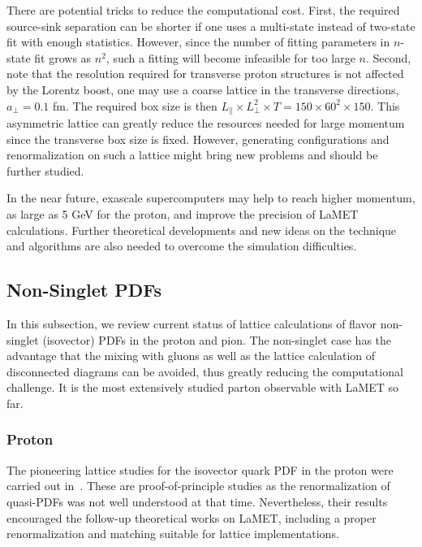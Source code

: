 There are potential tricks to reduce the computational cost.
%
First, the required source-sink separation can be shorter if one uses a multi-state instead of two-state fit with enough statistics.
%
However, since the number of fitting parameters in $n$-state fit grows as $n^2$, such a fitting will become infeasible for too large $n$.
%
Second, note that the resolution required for transverse proton structures is not affected by the Lorentz boost, one may use a coarse lattice in the transverse directions, $a_\perp=0.1$ fm.
%
The required box size is then $L_\parallel\times L_\perp^2\times T=150\times 60^2\times 150$.
%
This asymmetric lattice can greatly reduce the resources needed for large momentum since the transverse box size is fixed.
%
However, generating configurations and renormalization on such a lattice might bring new problems and should be further studied.

In the near future, exascale supercomputers may help to reach higher momentum, as large as 5 GeV for the proton,
and improve the precision of LaMET calculations. Further theoretical developments and new ideas on the technique and algorithms are also needed to overcome the simulation difficulties.


\subsection{Non-Singlet PDFs}
\label{sec:lattice-pdf}

In this subsection, we review current status of lattice calculations of flavor non-singlet (isovector) PDFs in the proton and
pion.
%
The non-singlet case has the advantage that the mixing with gluons as well as the lattice calculation of disconnected diagrams can be avoided, thus greatly reducing the computational challenge. It is the most extensively studied parton observable with LaMET so far.

\subsubsection{Proton}
\label{sec:lattice-pdf-proton}

The pioneering lattice studies for the isovector quark PDF in the proton were carried out in~\cite{Lin:2014zya,Alexandrou:2015rja}.
These are proof-of-principle studies as the renormalization of quasi-PDFs was not well understood at that time. Nevertheless, their results encouraged the follow-up theoretical works on LaMET, including a proper renormalization and matching suitable for lattice implementations.

